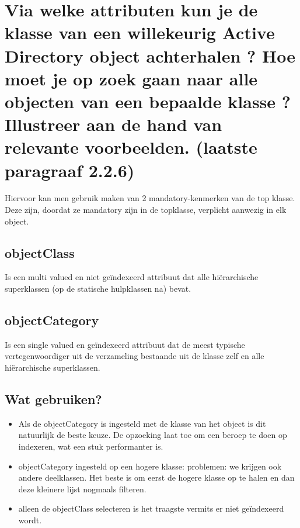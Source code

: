 \clearpage
\section{Via welke attributen kun je de klasse van een willekeurig Active Directory object achterhalen ? Hoe moet je op zoek gaan naar alle objecten van een bepaalde klasse ? Illustreer aan de hand van relevante voorbeelden. (laatste paragraaf 2.2.6)}

Hiervoor kan men gebruik maken van 2 mandatory-kenmerken van de top klasse. Deze zijn, doordat ze mandatory zijn in de topklasse, verplicht aanwezig in elk object.

\subsection{objectClass}
Is een multi valued en niet ge\"indexeerd attribuut dat alle hi\"erarchische superklassen (op de statische hulpklassen na) bevat.

\subsection{objectCategory}
Is een single valued en ge\"indexeerd attribuut dat de meest typische vertegenwoordiger uit de verzameling bestaande uit de klasse zelf en alle hi\"erarchische superklassen.

\subsection{Wat gebruiken?}
\begin{itemize}
\item Als de objectCategory is ingesteld met de klasse van het object is dit natuurlijk de beste keuze. De opzoeking laat toe om een beroep te doen op indexeren, wat een stuk performanter is.
\item objectCategory ingesteld op een hogere klasse: problemen: we krijgen ook andere deelklassen. Het beste is om eerst de hogere klasse op te halen en dan deze kleinere lijst nogmaals filteren. 
\item alleen de objectClass selecteren is het traagste vermits er niet ge\"indexeerd wordt.
\end{itemize}































